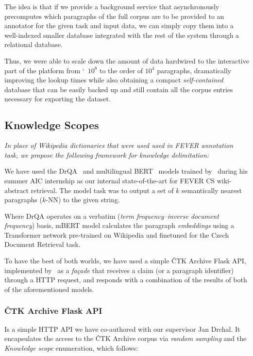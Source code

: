The idea is that if we provide a background service that asynchronously precomputes which paragraphs of the full corpus are to be provided to an annotator for the given task and input data, we can simply copy them into a well-indexed smaller database integrated with the rest of the system through a relational database. 

Thus, we were able to scale down the amount of data hardwired to the interactive part of the platform from \char`~$10^8$ to the order of $10^4$ paragraphs, dramatically improving the lookup times while also obtaining a compact \textit{self-contained}  database that can be easily backed up and still contain all the corpus entries necessary for exporting the dataset.


\subsection{Knowledge Scopes}
\label{sec:knowledge-scopes}
\textit{In place of \textsf{Wikipedia} \textit{dictionaries} that were used used in \textsf{FEVER} annotation task, we propose the following framework for knowledge delimitation:}



We have used the \textsf{DrQA}~\cite{drqa} and \textsf{multilingual BERT}~\cite{devlin2019bert} models trained by~\cite{michal} during his summer \textsf{AIC} internship as our internal state-of-the-art for \textsf{FEVER CS} \textsf{wiki-}abstract retrieval. The model task was to output a set of $k$ semantically nearest paragraphs ($k$-NN) to the given string.

Where \textsf{DrQA} operates on a verbatim (\textit{term frequency–inverse document frequency}) basis, \textsf{mBERT} model calculates the paragraph \textit{embeddings} using a Transformer network pre-trained on \textsf{Wikipedia} and finetuned for the Czech Document Retrieval task.

To have the best of both worlds, we have used a simple \textsf{ČTK Archive Flask API}, implemented by~\cite{honzagit} as a \textit{façade} that receives a claim (or a paragraph identifier) through a \textsf{HTTP} request, and responds with a combination of the results of both of the aforementioned models.

\subsubsection{ČTK Archive Flask API}
Is a simple \textsf{HTTP API} we have co-authored with our supervisor Jan Drchal. It encapsulates the access to the \textsf{ČTK Archive} corpus via \textit{random sampling} and the \textit{Knowledge scope} enumeration, which follows:

